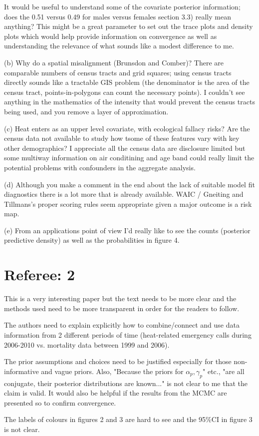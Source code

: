\documentclass{article}
\begin{document}
It would be useful to understand some of the covariate posterior information; does the 0.51 versus 0.49 for males versus females section 3.3) really mean anything?   This might be a great parameter to set out the trace plots and density plots which would help provide information on convergence as well as understanding the relevance of what sounds like a modest difference to me.

(b) Why do a spatial misalignment (Brunsdon and Comber)?   There are comparable numbers of census tracts and grid squares; using census tracts directly sounds like a tractable GIS problem (the denominator is the area of the census tract, points-in-polygons can count the necessary points).   I couldn't see anything in the mathematics of the intensity that would prevent the census tracts being used, and you remove a layer of approximation.

(c) Heat enters as an upper level covariate, with ecological fallacy risks?   Are the census data not available to study how tsome of these features vary with key other demographics?   I appreciate all the census data are disclosure limited but some multiway information on air conditining and age band could really limit the potential problems with confounders in the aggregate analysis.

(d) Although you make a comment in the end about the lack of suitable model fit diagnostics there is a lot more that is already available.   WAIC / Gneiting and Tillmans's proper scoring rules seem appropriate given a major outcome is a risk map.

(e) From an applications point of view I'd really like to see the counts (posterior predictive density) as well as the probabilities in figure 4.


\section{Referee: 2}


This is a very interesting paper but the text needs to be more clear and the methods used need to be more transparent in order for the readers to follow.

The authors need to explain explicitly how to combine/connect and use data information from 2 different periods of time (heat-related emergency calls  during 2006-2010 vs. mortality data between 1999 and 2006).

The prior assumptions and choices need to be justified especially for those non-informative and vague priors. Also, "Because the priors for $\alpha_p, \gamma_p$" etc., "are all conjugate, their posterior distributions are known..." is not clear to me that the claim is valid. It would also be helpful if the results from the MCMC are presented so to confirm convergence.

The labels of colours in figures 2 and 3 are hard to see and the 95\%CI in figure 3 is not clear.
\end{document}
